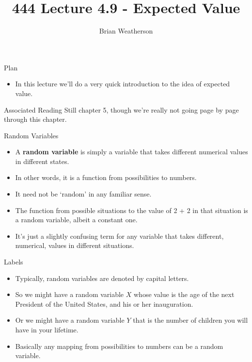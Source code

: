 \documentclass[
  ignorenonframetext,
]{beamer}
\title{444 Lecture 4.9 - Expected Value}
\author{Brian Weatherson}
\date{}
\providecommand{\tightlist}{%
  \setlength{\itemsep}{0pt}\setlength{\parskip}{0pt}}
\begin{document}
\frame{\titlepage}

\begin{frame}{Plan}
\protect\hypertarget{plan}{}
\begin{itemize}
\tightlist
\item
  In this lecture we'll do a very quick introduction to the idea of
  expected value.
\end{itemize}
\end{frame}

\begin{frame}{Associated Reading}
\protect\hypertarget{associated-reading}{}
Still chapter 5, though we're really not going page by page through this
chapter.
\end{frame}

\begin{frame}{Random Variables}
\protect\hypertarget{random-variables}{}
\begin{itemize}
\tightlist
\item
  A \textbf{random variable} is simply a variable that takes different
  numerical values in different states.
\item
  In other words, it is a function from possibilities to numbers.
\item
  It need not be `random' in any familiar sense.
\item
  The function from possible situations to the value of 2 + 2 in that
  situation is a random variable, albeit a constant one.
\item
  It's just a slightly confusing term for any variable that takes
  different, numerical, values in different situations.
\end{itemize}
\end{frame}

\begin{frame}{Labels}
\protect\hypertarget{labels}{}
\begin{itemize}
\tightlist
\item
  Typically, random variables are denoted by capital letters.
\item
  So we might have a random variable \(X\) whose value is the age of the
  next President of the United States, and his or her inauguration.
\item
  Or we might have a random variable \(Y\) that is the number of
  children you will have in your lifetime.
\item
  Basically any mapping from possibilities to numbers can be a random
  variable.
\end{itemize}
\end{frame}
\end{document}
